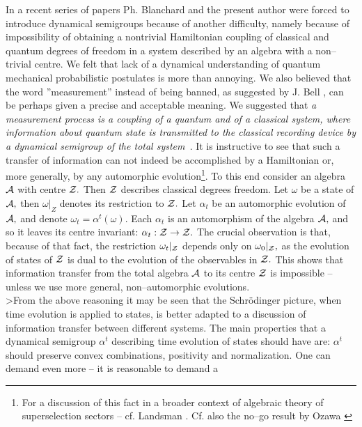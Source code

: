 \documentclass[12pt]{article}
\begin{document}
In a recent series of papers \cite{bla1,bla2,bla3,bla4} Ph. Blanchard and
the present author were forced to introduce dynamical semigroups because of
another difficulty,  namely because of  impossibility of obtaining 
a nontrivial Hamiltonian
coupling of classical and quantum degrees of freedom in a system described
by an algebra with a non--trivial centre.  We felt that lack of a
dynamical understanding of quantum mechanical probabilistic postulates is
more than annoying.  We also believed that the word ''measurement'' instead 
of being
banned,  as suggested by J.  Bell \cite{bel1,bel2},  can be perhaps given a precise
and acceptable meaning.  We suggested that {\sl a measurement process is a 
coupling of a
quantum and of a classical system,  where information about quantum state is
transmitted to the classical recording device by a dynamical semigroup of
the total system\ }.  It is instructive to see that such a transfer of
information can not indeed be accomplished by a Hamiltonian or,  more generally, 
 by
any automorphic evolution\footnote{For a discussion of this fact in a broader 
context
of algebraic theory of superselection sectors -- cf. 
Landsman \cite[Sec. 4. 4]{lan}. Cf. also the no--go result by 
Ozawa \cite{oza}}.  To this end consider an algebra ${\cal A}$ with
centre ${\cal Z}. $ Then ${\cal Z}$ describes classical degrees freedom.  Let 
$\omega $ be a state of ${\cal A}, $ then ${\omega}|_Z$ denotes its
restriction to ${\cal Z}. $ Let $\alpha _t$ be an automorphic evolution of $
{\cal A}, $ and denote $\omega _t=\alpha ^t (\omega ). $ Each $\alpha _t$ is
an automorphism of the algebra ${\cal A} , $  and so it leaves its centre 
invariant:  
$\alpha _t: {\cal Z}\rightarrow {\cal Z}. $ The crucial observation is that,
because of that fact,  the restriction ${\omega _t}|_{{\cal Z}}$ depends only 
on ${
\omega _0}|_{{\cal Z}}, $ as the evolution of states of ${\cal Z}$ is dual to
the evolution of the observables in ${\cal Z}. $ This shows that information
transfer from the total algebra ${\cal A}$ to its centre ${\cal Z}$ is
impossible -- unless we use more general,  non--automorphic evolutions. \\
>From the above reasoning it may be seen that the Schr\"odinger picture,  when
time evolution is applied to states,  is better adapted to a discussion of
information transfer between different systems.  The main properties that a
dynamical semigroup $\alpha ^t$ describing time evolution of states should
have are:  $\alpha ^t$ should preserve convex combinations,  positivity and
normalization.  One can demand even more -- it is reasonable to demand a
\end{document}

